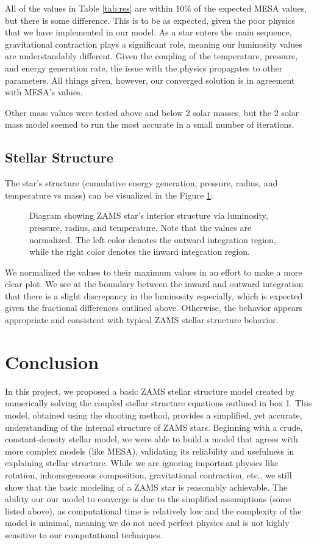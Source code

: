 \documentclass[twocolumn]{aastex631}
\begin{document}
All of the values in Table \ref{tab:res} are within 10\% of the expected MESA values, but there is some difference. This is to be as expected, given the poor physics that we have implemented in our model. As a star enters the main sequence, gravitational contraction plays a significant role, meaning our luminosity values are understandably different. Given the coupling of the temperature, pressure, and energy generation rate, the issue with the physics propagates to other parameters. All things given, however, our converged solution is in agreement with MESA's values.

Other mass values were tested above and below 2 solar masses, but the 2 solar mass model seemed to run the most accurate in a small number of iterations.

\subsection{Stellar Structure}

The star's structure (cumulative energy generation, pressure, radius, and temperature vs mass) can be visualized in the Figure \ref{fig:tot}: 

\begin{figure}[ht!]
	\label{fig:tot}
	\caption{Diagram showing ZAMS star's interior structure via luminosity, pressure, radius, and temperature. Note that the values are normalized. The left color denotes the outward integration region, while the right color denotes the inward integration region.}
\end{figure}

We normalized the values to their maximum values in an effort to make a more clear plot. We see at the boundary between the inward and outward integration that there is a slight discrepancy in the luminosity especially, which is expected given the fractional differences outlined above. Otherwise, the behavior appears appropriate and consistent with typical ZAMS stellar structure behavior.


\section{Conclusion}

In this project, we proposed a basic ZAMS stellar structure model created by numerically solving the coupled stellar structure equations outlined in box 1. This model, obtained using the shooting method, provides a simplified, yet accurate, understanding of the internal structure of ZAMS stars. Beginning with a crude, constant-density stellar model, we were able to build a model that agrees with more complex models (like MESA), validating its reliability and usefulness in explaining stellar structure. While we are ignoring important physics like rotation, inhomogeneous composition, gravitational contraction, etc., we still show that the basic modeling of a ZAMS star is reasonably achievable. The ability our our model to converge is due to the simplified assumptions (some listed above), as computational time is relatively low and the complexity of the model is minimal, meaning we do not need perfect physics and is not highly sensitive to our computational techniques.
\end{document}

